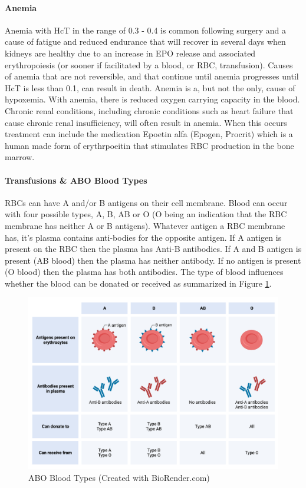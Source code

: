 \paragraph{Anemia}
Anemia with HcT in the range of 0.3 - 0.4 is common following surgery and a cause of fatigue and reduced endurance that will recover in several days when kidneys are healthy due to an increase in EPO release and associated erythropoiesis (or sooner if facilitated by a blood, or RBC, transfusion). Causes of anemia that are not reversible, and that continue until anemia progresses until HcT is less than 0.1, can result in death. Anemia is a, but not the only, cause of hypoxemia. With anemia, there is reduced oxygen carrying capacity in the blood. Chronic renal conditions, including chronic conditions such as heart failure that cause chronic renal insufficiency, will often result in anemia. When this occurs treatment can include the medication Epoetin alfa (Epogen, Procrit) which is a human made form of erythrpoeitin that stimulates RBC production in the bone marrow.


\paragraph{Transfusions \& ABO Blood Types}

RBCs can have A and/or B antigens on their cell membrane. Blood can occur with four possible types, A, B, AB or O (O being an indication that the RBC membrane has neither A or B antigens). Whatever antigen a RBC membrane has, it's plasma contains anti-bodies for the opposite antigen. If A antigen is present on the RBC then the plasma has Anti-B antibodies. If A and B antigen is present (AB blood) then the plasma has neither antibody. If no antigen is present (O blood) then the plasma has both antibodies. The type of blood influences whether the blood can be donated or received as summarized in Figure \ref{fig:ABO}.

\begin{figure}[!h]
    \centering
    \includegraphics[width=1.0\linewidth]{./figure/ABO.png}
    \caption{ABO Blood Types \footnotesize{(Created with BioRender.com)}}
    \label{fig:ABO}
\end{figure}

